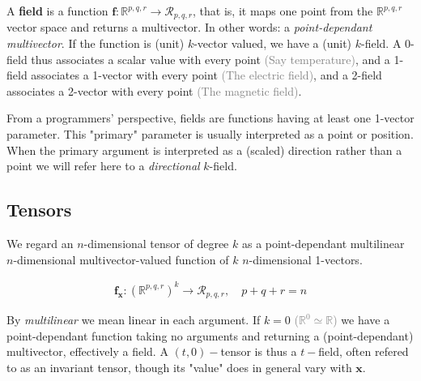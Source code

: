\documentclass[a4paper]{book}
\numberwithin{equation}{chapter}
\begin{document}
A \textbf{field} is a function $\mathbf{f} : \mathbb{R}^{p,q,r} \rightarrow 
\mathcal{R}_{p,q,r}$, that is, it maps one point from the $\mathbb{R}^{p,q,r}$
vector space and returns a multivector. 
In other words: a \emph{point-dependant multivector}. If 
the function is (unit) $k$-vector valued, we have a (unit) $k$-field. 
A 0-field thus associates a scalar value with every point \textcolor{gray}{(Say temperature)},
and a 1-field associates a 1-vector with every point \textcolor{gray}{(The electric field)},
and a 2-field associates a 2-vector with every point \textcolor{gray}{(The magnetic field)}.

\vspace{\baselineskip}

From a programmers' perspective, fields are functions having at least one 1-vector parameter.
This "primary" parameter is usually interpreted as a point or position. When the primary 
argument is interpreted as a (scaled) direction rather than a point we will refer here to a 
\emph{directional} $k$-field. 

\subsection{Tensors}


\begin{tcolorbox}[colback=white, colframe=blue!10!black, title=\textbf{Tensor definition} ]

We regard an $n$-dimensional tensor of degree $k$ as a point-dependant multilinear 
$n$-dimensional multivector-valued function of $k$ $n$-dimensional 1-vectors. 

\begin{align*}
    \mathbf{f_x} : (\mathbb{R}^{p,q,r})^k \rightarrow \mathcal{R}_{p,q,r}, \quad p+q+r=n
\end{align*}

\end{tcolorbox} 

\vspace{\baselineskip}

By \emph{multilinear} we mean linear in each argument. If $k=0$ \textcolor{gray}{($\mathbb{R}^0 \simeq \mathbb{R}$)}
we have a point-dependant function taking no arguments and returning a (point-dependant) multivector, effectively a field.
A $(t,0)-$tensor is thus a $t-$field, often refered to as an invariant tensor, though its "value" does in general vary with 
$\mathbf{x}$.

\vspace{\baselineskip}
\end{document}
